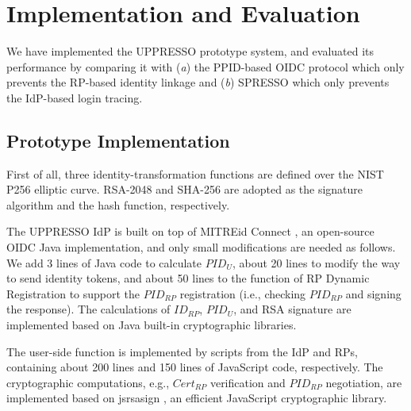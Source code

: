 \section{Implementation and Evaluation}
\label{sec:implementation}
We have implemented the UPPRESSO prototype system, and evaluated its performance
 by comparing it with (\emph{a}) the PPID-based OIDC protocol \cite{MITREid} 
    which only prevents the RP-based identity linkage
     and (\emph{b}) SPRESSO \cite{SPRESSO} which only prevents the IdP-based login tracing.

\subsection{Prototype Implementation}
First of all, three identity-transformation functions are defined over
        the NIST P256 elliptic curve.
RSA-2048 and SHA-256 are adopted as the signature algorithm and the hash function, respectively.

The UPPRESSO IdP is built on top of MITREid Connect \cite{MITREid},
    an open-source OIDC Java implementation, %
    and only small modifications are needed as follows.
We add 3 lines of Java code to calculate $PID_U$,
     about 20 lines to modify the way to send identity tokens,
    and about 50 lines to the function of RP Dynamic Registration to support the $PID_{RP}$ registration
            (i.e., checking $PID_{RP}$ and signing the response).
The calculations of $ID_{RP}$, $PID_U$, and RSA signature are implemented based on Java built-in cryptographic libraries. %

The user-side function is implemented by scripts from the IdP and RPs,
     containing about 200 lines and 150 lines of JavaScript code, respectively.
The cryptographic computations, e.g., $Cert_{RP}$ verification and $PID_{RP}$ negotiation, are implemented based on jsrsasign \cite{jsrsasign}, an efficient JavaScript cryptographic library.

